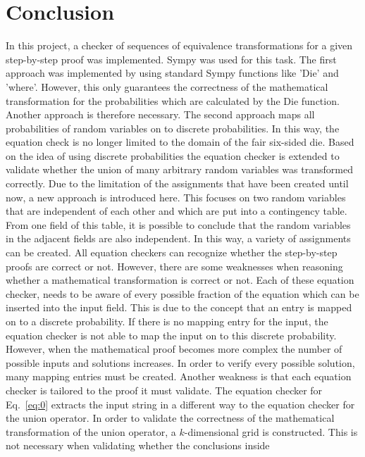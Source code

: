 
    \chapter{Conclusion}
    In this project, a checker of sequences of equivalence transformations for a given step-by-step proof was implemented. Sympy was used for this task.
    The first approach was implemented by using standard Sympy functions like 'Die' and 'where'. However, this only guarantees the correctness of the mathematical transformation
    for the probabilities which are calculated by the Die function. Another approach is therefore necessary. The second approach maps all probabilities of random variables
    on to discrete probabilities. In this way, the equation check is no longer limited to the domain of the fair six-sided die.
    Based on the idea of using discrete probabilities the equation checker is extended to validate whether the union of many arbitrary random variables was transformed correctly.
    Due to the limitation of the assignments that have been created until now, a new approach is introduced here. This focuses on two random variables that are independent of each other and which are put into a contingency table.
    From one field of this table, it is possible to conclude that the random variables in the adjacent fields are also independent. In this way, a variety of assignments can be created.
    All equation checkers can recognize whether the step-by-step proofs are correct or not. However, there are some weaknesses when reasoning whether a mathematical transformation is correct or not. Each of these equation checker,
    needs to be aware of every possible fraction of the equation which can be inserted into the input field. This is due to the concept that an entry is mapped on to a discrete probability. If there is no mapping entry for the input, the equation
    checker is not able to map the input on to this discrete probability. However, when the mathematical proof becomes more complex the number of possible inputs and solutions increases. In order to verify every possible solution,
    many mapping entries must be created. Another weakness is that each equation checker is tailored to the proof it must validate. The equation checker for Eq.~\eqref{eq:0} extracts the input string in a different way to the equation checker for
    the union operator. In order to validate the correctness of the mathematical transformation of the union operator, a $k$-dimensional grid is constructed. This is not necessary when validating whether the conclusions inside
